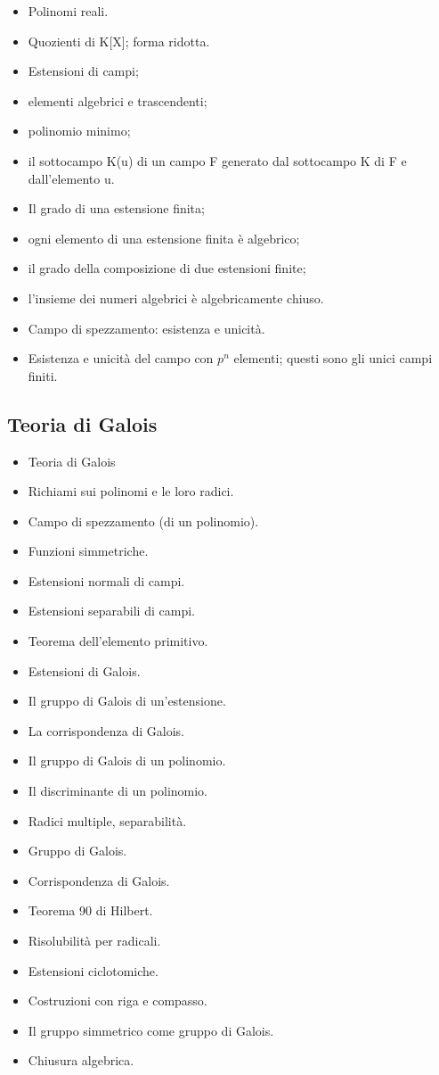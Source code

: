 \begin{itemize}
 \item Polinomi reali.
 \item Quozienti di K[X]; forma ridotta. 
 \item Estensioni di campi; 
 \item elementi algebrici e trascendenti;
 \item polinomio minimo; 
 \item il sottocampo K(u) di un campo F generato dal sottocampo K di F e dall'elemento u. 
 \item Il grado di una estensione finita; 
 \item ogni elemento di una estensione finita è algebrico; 
 \item il grado della composizione di due estensioni finite; 
 \item l'insieme dei numeri algebrici è algebricamente chiuso. 
 \item Campo di spezzamento: esistenza e unicità. 
 \item Esistenza e unicità del campo con $p^n$ elementi; questi sono gli unici campi finiti.
 \end{itemize}




\subsection*{Teoria di Galois}
\begin{itemize}
 \item Teoria di Galois
 \item Richiami sui polinomi e le loro radici. 
 \item Campo di spezzamento (di un polinomio). 
 \item Funzioni simmetriche.
 \item Estensioni normali di campi. 
 \item Estensioni separabili di campi. 
 \item Teorema dell'elemento primitivo. 
 \item Estensioni di Galois. 
 \item Il gruppo di Galois di un'estensione. 
 \item La corrispondenza di Galois. 
 \item Il gruppo di Galois di un polinomio. 
 \item Il discriminante di un polinomio.
 \item Radici multiple, separabilità.
 \item Gruppo di Galois. 
 \item Corrispondenza di Galois. 
 \item Teorema 90 di Hilbert.
 \item Risolubilità per radicali. 
 \item Estensioni ciclotomiche.
 \item Costruzioni con riga e compasso.
 \item Il gruppo simmetrico come gruppo di Galois.
 \item Chiusura algebrica.
\end{itemize}

